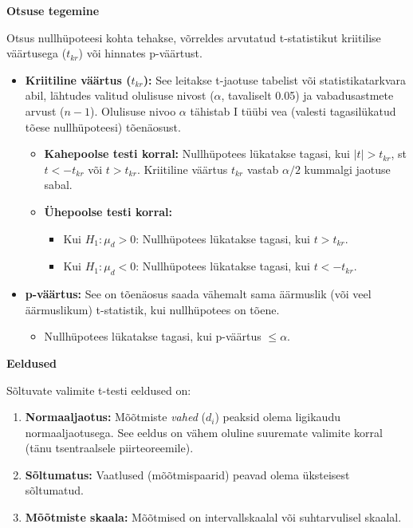\documentclass[
]{book}
\providecommand{\tightlist}{%
  \setlength{\itemsep}{0pt}\setlength{\parskip}{0pt}}
\theoremstyle{definition}
\theoremstyle{definition}
\theoremstyle{definition}
\theoremstyle{definition}
\theoremstyle{remark}
\begin{document}
\textbf{Otsuse tegemine}

Otsus nullhüpoteesi kohta tehakse, võrreldes arvutatud t-statistikut kriitilise väärtusega (\(t_{kr}\)) või hinnates p-väärtust.

\begin{itemize}
\tightlist
\item
  \textbf{Kriitiline väärtus (\(t_{kr}\)):} See leitakse t-jaotuse tabelist või statistikatarkvara abil, lähtudes valitud olulisuse nivost (\(\alpha\), tavaliselt 0.05) ja vabadusastmete arvust (\(n-1\)). Olulisuse nivoo \(\alpha\) tähistab I tüübi vea (valesti tagasilükatud tõese nullhüpoteesi) tõenäosust.

  \begin{itemize}
  \tightlist
  \item
    \textbf{Kahepoolse testi korral:} Nullhüpotees lükatakse tagasi, kui \(|t| > t_{kr}\), st \(t < -t_{kr}\) või \(t > t_{kr}\). Kriitiline väärtus \(t_{kr}\) vastab \(\alpha/2\) kummalgi jaotuse sabal.
  \item
    \textbf{Ühepoolse testi korral:}

    \begin{itemize}
    \tightlist
    \item
      Kui \(H_1: \mu_d > 0\): Nullhüpotees lükatakse tagasi, kui \(t > t_{kr}\).
    \item
      Kui \(H_1: \mu_d < 0\): Nullhüpotees lükatakse tagasi, kui \(t < -t_{kr}\).
    \end{itemize}
  \end{itemize}
\item
  \textbf{p-väärtus:} See on tõenäosus saada vähemalt sama äärmuslik (või veel äärmuslikum) t-statistik, kui nullhüpotees on tõene.

  \begin{itemize}
  \tightlist
  \item
    Nullhüpotees lükatakse tagasi, kui p-väärtus \(\leq \alpha\).
  \end{itemize}
\end{itemize}

\textbf{Eeldused}

Sõltuvate valimite t-testi eeldused on:

\begin{enumerate}
\def\labelenumi{\arabic{enumi}.}
\tightlist
\item
  \textbf{Normaaljaotus:} Mõõtmiste \emph{vahed} (\(d_i\)) peaksid olema ligikaudu normaaljaotusega. See eeldus on vähem oluline suuremate valimite korral (tänu tsentraalsele piirteoreemile).
\item
  \textbf{Sõltumatus:} Vaatlused (mõõtmispaarid) peavad olema üksteisest sõltumatud.
\item
  \textbf{Mõõtmiste skaala:} Mõõtmised on intervallskaalal või suhtarvulisel skaalal.
\end{enumerate}
\end{document}
